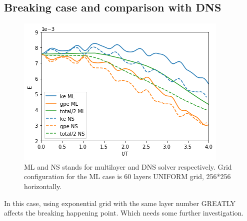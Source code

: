 \documentclass{article}
\begin{document}
\subsection{Breaking case and comparison with DNS}
\begin{figure}[h!]
    \centering
    \includegraphics[width=0.8\linewidth]{figures/stoke_mlns_comparison.png}
    \caption{ML and NS stands for multilayer and DNS solver respectively. Grid configuration for the ML case is 60 layers UNIFORM grid, 256*256 horizontally.}
    \label{fig:fig1}
\end{figure}

In this case, using exponential grid with the same layer number GREATLY affects the breaking happening point. Which needs some further investigation.
\end{document}
